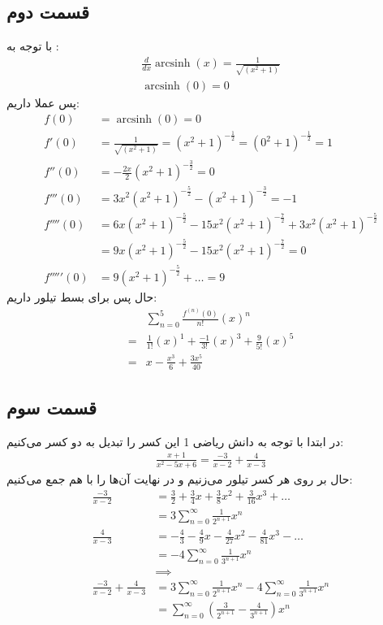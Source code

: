 \documentclass[]{article}
\begin{document}
\subsection*{قسمت دوم}
با توجه به :
\begin{gather*}
    \frac{d}{dx}\operatorname{arcsinh}(x) = \frac{1}{\sqrt{(x^2+1)}}\\
    \operatorname{arcsinh}(0) = 0
\end{gather*}
پس عملا داریم:
\begin{align*}
    f(0) &= \operatorname{arcsinh}(0) = 0\\
    f'(0) &= \frac{1}{\sqrt{(x^2+1)}} = (x^2+1)^{-\frac{1}{2}} = (0^2+1)^{-\frac{1}{2}} = 1\\
    f''(0) &= -\frac{2x}{2} (x^2+1)^{-\frac{3}{2}} = 0\\
    f'''(0) &= 3x^2 (x^2+1)^{-\frac{5}{2}} - (x^2+1)^{-\frac{3}{2}} = -1\\
    f''''(0) &= 6x (x^2+1)^{-\frac{5}{2}} - 15x^2 (x^2+1)^{-\frac{7}{2}} + 3x^2 (x^2+1)^{-\frac{5}{2}} \\
    &= 9x (x^2+1)^{-\frac{5}{2}} - 15x^2 (x^2+1)^{-\frac{7}{2}} = 0\\
    f'''''(0) &= 9 (x^2+1)^{-\frac{5}{2}} + \dots = 9
\end{align*}
حال پس برای بسط تیلور داریم:
\begin{align*}
    &\sum_{n=0}^{5} \frac{f^{(n)}(0)}{n!}(x)^n\\
    =&\frac{1}{1!}(x)^1 + \frac{-1}{3!}(x)^3 + \frac{9}{5!}(x)^5\\
    =&\boxed{x - \frac{x^3}{6} + \frac{3x^5}{40}}
\end{align*}
\subsection*{قسمت سوم}
در ابتدا با توجه به دانش ریاضی 1 این کسر را تبدیل به دو کسر می‌کنیم:
\begin{gather*}
    \frac{x+1}{x^2-5x+6} = \frac{-3}{x-2} + \frac{4}{x-3}
\end{gather*}
حال بر روی هر کسر تیلور می‌زنیم و در نهایت آن‌ها را با هم جمع می‌کنیم:
\begin{align*}
    \frac{-3}{x-2} &= \frac{3}{2}+\frac{3}{4} x +\frac{3}{8} x^{2}+\frac{3}{16} x^{3}+\dots\\
    &= 3 \sum_{n=0}^{\infty} \frac{1}{2^{n+1}}x^n\\
    \frac{4}{x-3} &= -\frac{4}{3}-\frac{4}{9} x -\frac{4}{27} x^{2}-\frac{4}{81} x^{3}-\dots\\
    &= -4 \sum_{n=0}^{\infty} \frac{1}{3^{n+1}}x^n\\
    &\implies\\
    \frac{-3}{x-2} + \frac{4}{x-3} &= 3 \sum_{n=0}^{\infty} \frac{1}{2^{n+1}}x^n -4 \sum_{n=0}^{\infty} \frac{1}{3^{n+1}}x^n\\
    &= \boxed{\sum_{n=0}^{\infty} (\frac{3}{2^{n+1}} - \frac{4}{3^{n+1}})x^n}
\end{align*}
\end{document}
